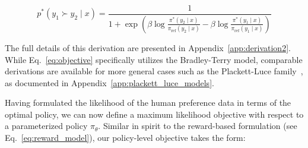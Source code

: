 \begin{equation}\label{eq:objective}
    p^*(y_1\succ y_2 \mid x)=\frac{1}{1 + \exp\left(\beta \log \frac{\pi^*(y_2\mid x)}{\pi_\text{ref}(y_2\mid x)} - \beta \log \frac{\pi^*(y_1\mid x)}{\pi_\text{ref}(y_1\mid x)}\right)}
\end{equation}

The full details of this derivation are presented in Appendix~\ref{app:derivation2}. While Eq.~\ref{eq:objective} specifically utilizes the Bradley-Terry model, comparable derivations are available for more general cases such as the Plackett-Luce family~\citep{plackett1975analysis, luce2012individual}, as documented in Appendix~\ref{app:plackett_luce_models}.

Having formulated the likelihood of the human preference data in terms of the optimal policy, we can now define a maximum likelihood objective with respect to a parameterized policy $\pi_\theta$. Similar in spirit to the reward-based formulation (see Eq.~\ref{eq:reward_model}), our policy-level objective takes the form:

